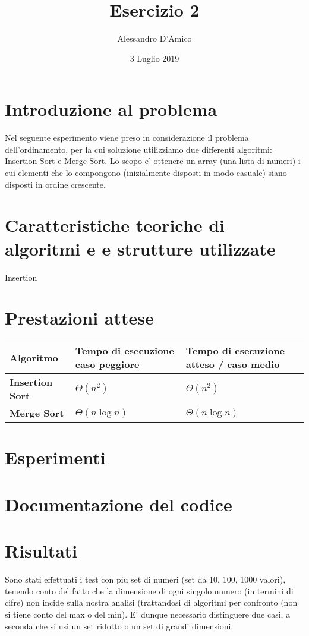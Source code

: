 \documentclass[a4paper]{article}
\title {{\TitleFont Esercizio 2}}
\date{3 Luglio 2019}
\author{{\AuthFont Alessandro D'Amico}}
\begin{document}
\begin{titlingpage}
\maketitle
\end{titlingpage}
\tableofcontents
\newpage
\section{Introduzione al problema}
Nel seguente esperimento viene preso in considerazione il problema dell'ordinamento, per la cui soluzione utilizziamo due differenti algoritmi: Insertion Sort e Merge Sort.
Lo scopo e' ottenere un array (una lista di numeri) i cui elementi che lo compongono (inizialmente disposti in modo casuale) siano disposti in ordine crescente.
\section{Caratteristiche teoriche di algoritmi e e strutture utilizzate}
Insertion
\section{Prestazioni attese}
	\begin{tabularx}{10cm}{|X|X|X|}
	\hline
	Algoritmo & Tempo di esecuzione caso peggiore & Tempo di esecuzione atteso / caso medio \\
	\hline
	\textbf{Insertion Sort} & $\Theta(n^2)$  & $\Theta(n^2)$ \\
	\hline
	\textbf{Merge Sort} &  $\Theta(n\log{}n)$ & $\Theta(n\log{}n)$\\
	\hline
	\end{tabularx}
\section{Esperimenti}
\section{Documentazione del codice}
\newpage
\section{Risultati}
Sono stati effettuati i test con piu set di numeri (set da 10, 100, 1000 valori), tenendo conto del fatto che la dimensione di ogni singolo numero (in termini di cifre) non incide sulla nostra analisi (trattandosi di algoritmi per confronto (non si tiene conto del max o del min). E' dunque necessario distinguere due casi, a seconda che si usi un set ridotto o un set di grandi dimensioni. 
\end{document}

